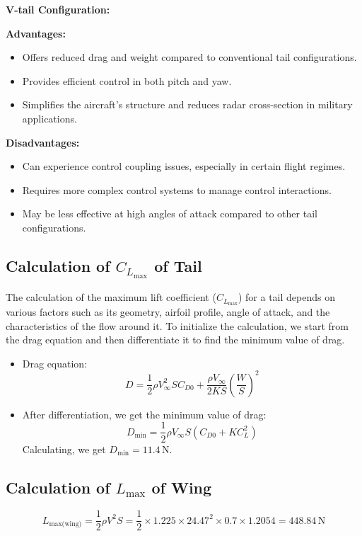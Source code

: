 \documentclass[12 pt]{article}
\begin{document}
{{\textbf{V-tail Configuration:}}

{\color{black}
\textbf{{Advantages:}}
\begin{itemize}
  \item Offers reduced drag and weight compared to conventional tail configurations.
  \item Provides efficient control in both pitch and yaw.
  \item Simplifies the aircraft's structure and reduces radar cross-section in military applications.
\end{itemize}

\textbf{{Disadvantages:}}
\begin{itemize}
  \item Can experience control coupling issues, especially in certain flight regimes.
  \item Requires more complex control systems to manage control interactions.
  \item May be less effective at high angles of attack compared to other tail configurations.
\end{itemize}
\newpage
 \subsection{Calculation of $C_{L_{\text{max}}}$ of Tail}
The calculation of the maximum lift coefficient ($C_{L_{\text{max}}}$) for a tail depends on various factors such as its geometry, airfoil profile, angle of attack, and the characteristics of the flow around it. To initialize the calculation, we start from the drag equation and then differentiate it to find the minimum value of drag.

\begin{itemize}
    \item Drag equation:
    \[ D = \frac{1}{2} \rho V_{\infty}^2 S C_{D0} + \frac{\rho V_{\infty}}{2KS} \left(\frac{W}{S}\right)^2 \]
    
    \item After differentiation, we get the minimum value of drag:
    \[ D_{\text{min}} = \frac{1}{2} \rho V_{\infty} S (C_{D0} + K C_L^2) \]
    Calculating, we get $D_{\text{min}} = 11.4 \, \text{N}$.
\end{itemize}

\subsection{Calculation of $L_{\text{max}}$ of Wing}
\[ L_{\text{max(wing)}} = \frac{1}{2} \rho V^2 S = \frac{1}{2} \times 1.225 \times 24.47^2 \times 0.7 \times 1.2054 = 448.84 \, \text{N} \]

}}
\end{document}
